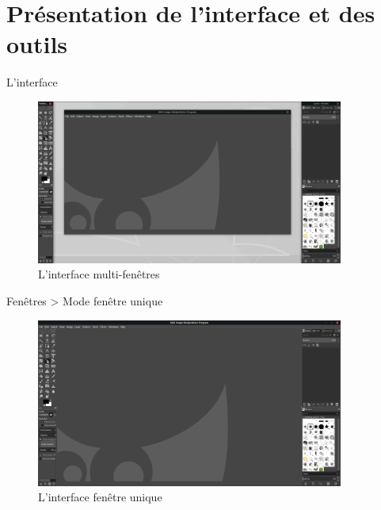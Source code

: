 \documentclass[10pt,svgnames,usenames,table]{beamer}
\begin{document}
\section{Présentation de l'interface et des outils}
\begin{frame}[allowframebreaks]{L'interface}
    \begin{figure}
        \centering
        \includegraphics[width=0.9\textwidth]{Images/gimp_multiple_windows}
        \caption{L'interface multi-fenêtres}
    \end{figure} 
    \framebreak
    \begin{center}
        Fenêtres > Mode fenêtre unique
        \begin{figure}
            \includegraphics[width=0.9\textwidth]{Images/gimp_single_window}
            \caption{L'interface fenêtre unique}
        \end{figure}
    \end{center}
\end{frame}
\end{document}
